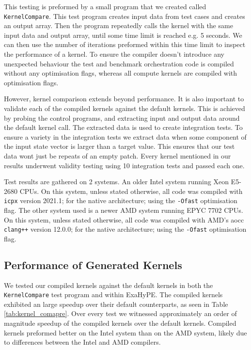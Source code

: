 This testing is preformed by a small program that we created called \texttt{KernelCompare}.
This test program creates input data from test cases and creates an output array.
Then the program repeatedly calls the kernel with the same input data and output array, until some time limit is reached e.g. 5 seconds.
We can then use the number of iterations preformed within this time limit to inspect the performance of a kernel.
To ensure the compiler doesn't introduce any unexpected behaviour the test and benchmark orchestration code is compiled without any optimisation flags, whereas all compute kernels are compiled with optimisation flags.

However, kernel comparison extends beyond performance.
It is also important to validate each of the compiled kernels against the default kernels.
This is achieved by probing the control programs, and extracting input and output data around the default kernel call.
The extracted data is used to create integration tests.
To ensure a variety in the integration tests we extract data when some component of the input state vector is larger than a target value. 
This ensures that our test data wont just be repeats of an empty patch.
Every kernel mentioned in our results underwent validity testing using 10 integration tests and passed each one.

Test results are gathered on 2 systems.
An older Intel system running Xeon E5-2680 CPUs.
On this system, unless stated otherwise, all code was compiled with \texttt{icpx} version 2021.1; for the native architecture; using the \texttt{-Ofast} optimisation flag.
The other system used is a newer AMD system running EPYC 7702 CPUs.
On this system, unless stated otherwise, all code was compiled with AMD's aocc \texttt{clang++} version 12.0.0; for the native architecture; using the \texttt{-Ofast} optimisation flag. 

\subsection{Performance of Generated Kernels}

We tested our compiled kernels against the default kernels in both the \texttt{KernelCompare} test program and within ExaHyPE.
The compiled kernels exhibited an large speedup over their default counterparts, as seen in Table \ref{tab:kernel_comapre}.
Over every test we witnessed approximately an order of magnitude speedup of the compiled kernels over the default kernels.
Compiled kernels preformed better on the Intel system than on the AMD system, likely due to differences between the Intel and AMD compilers. 

